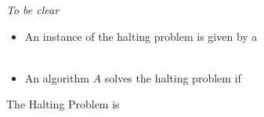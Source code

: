 \documentclass[11  pt]{article}
\begin{document}
\emph{To be clear}
\begin{itemize}
	\item An instance of the halting problem is given by a \\ \\
	\item An algorithm $A$ solves the halting problem if %
\end{itemize}


\newpage

\begin{theorem} The Halting Problem is 
\end{theorem}
\end{document}
